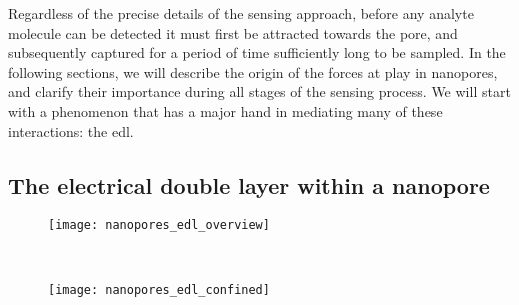 Regardless of the precise details of the sensing approach, before any analyte molecule can be detected it must
first be attracted towards the pore, and subsequently captured for a period of time sufficiently long to be
sampled. In the following sections, we will describe the origin of the forces at play in nanopores, and
clarify their importance during all stages of the sensing process. We will start with a phenomenon that has a
major hand in mediating many of these interactions: the \gls{edl}.


\subsection{The electrical double layer within a nanopore}
%
\label{sec:np:edl}
%

%
\begin{figure*}[ptb]
  \centering

  \begin{subfigure}[t]{115mm}
    \centering
    \caption{}\vspace{-2.5mm}\label{fig:nanopores_edl_overview}
    \texttt{[image: nanopores\_edl\_overview]}
  \end{subfigure}
  \\
  \begin{subfigure}[t]{115mm}
    \centering
    \caption{}\vspace{-2.5mm}\label{fig:nanopores_edl_confined}
    \texttt{[image: nanopores\_edl\_confined]}
  \end{subfigure}

\caption[Schematic overview of the structure of the electrical double layer]{%
  \textbf{Schematic overview of the structure of the electrical double layer (EDL).}
  ()
  When a charged surface is brought into contact with an electrolyte solution, mobile ions of opposite charge
  (\ie~the counterions) will accumulate near the surface, whereas same-charge ions (\ie~the co-ions) will
  deplete. This region of excess charge in the fluid is called the , and has a characteristic
  thickness equal to the Debye length ($\dbl$, see~\cref{eq:nanopores_debye_length}). Counterions in the Stern
  layer are semi-permanently bound to the surface and partially lose their hydration shell. Because the
  surface electrostatic potential drops exponentially inside the electrical double layer, its influence
  becomes negligible after a few Debye lengths, rapidly resulting in an electroneutral bulk ionic
  distribution.
  ()
  Effect of geometrical confinement on the composition of the \gls{edl} within a nanopore at high (left) and
  low (right) ionic strengths. At high salt concentrations, $\dbl$ is short enough to allow the center of the
  pore to remain electroneutral. At low salt concentrations on the other hand, $\dbl$ is the same of larger
  than the radius of the pore, the \glspl{edl} begin to overlap and the center of the pore also contains an
  excess of counterions. Regardless of the salt concentration, the \gls{edl} takes up a significant portion of
  the total pore volume, and hence plays an important role in all nanopore transport phenomena.
  }\label{fig:nanopores_edl}
\end{figure*}

